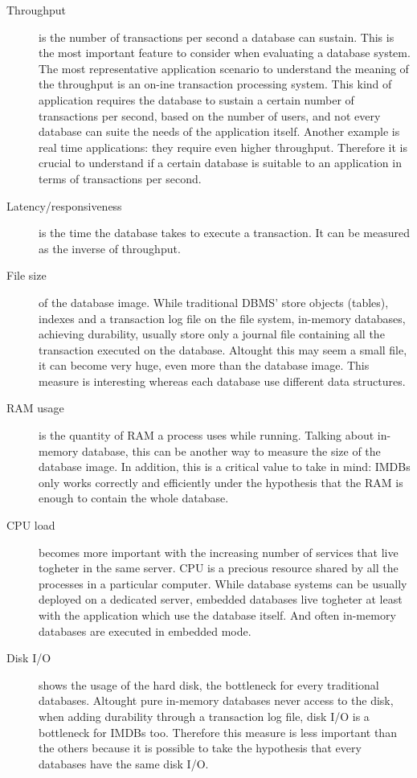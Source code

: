 \begin{description}

	\item[Throughput] is the number of transactions per second a database can sustain. This is the most important feature to consider when evaluating a database system. The most representative application scenario to understand the meaning of the throughput is an on-ine transaction processing system. This kind of application requires the database to sustain a certain number of transactions per second, based on the number of users, and not every database can suite the needs of the application itself. Another example is real time applications: they require even higher throughput. Therefore it is crucial to understand if a certain database is suitable to an application in terms of transactions per second.
	
	\item[Latency/responsiveness] is the time the database takes to execute a transaction. It can be measured as the inverse of throughput.
	
	\item[File size] of the database image. While traditional DBMS' store objects (tables), indexes and a transaction log file on the file system, in-memory databases, achieving durability, usually store only a journal file containing all the transaction executed on the database. Altought this may seem a small file, it can become very huge, even more than the database image. This measure is interesting whereas each database use different data structures.
	
	\item[RAM usage] is the quantity of RAM a process uses while running. Talking about in-memory database, this can be another way to measure the size of the database image. In addition, this is a critical value to take in mind: IMDBs only works correctly and efficiently under the hypothesis that the RAM is enough to contain the whole database.
	
	\item[CPU load] becomes more important with the increasing number of services that live togheter in the same server. CPU is a precious resource shared by all the processes in a particular computer. While database systems can be usually deployed on a dedicated server, embedded databases live togheter at least with the application which use the database itself. And often in-memory databases are executed in embedded mode.
	
	\item[Disk I/O] shows the usage of the hard disk, the bottleneck for every traditional databases. Altought pure in-memory databases never access to the disk, when adding durability through a transaction log file, disk I/O is a bottleneck for IMDBs too. Therefore this measure is less important than the others because it is possible to take the hypothesis that every databases have the same disk I/O.
	

\end{description}
